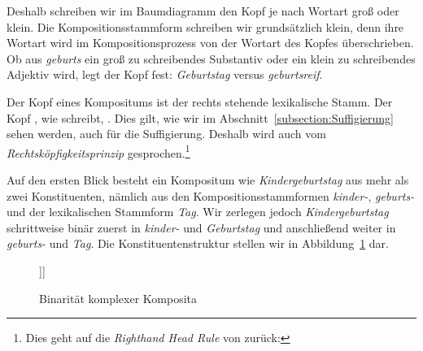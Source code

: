 \largerpage[2]
Deshalb schreiben wir im Baumdiagramm den Kopf je nach Wortart groß oder klein. Die Kompositionsstammform schreiben wir grundsätzlich klein, denn ihre Wortart wird im Kompositionsprozess von der Wortart des Kopfes überschrieben. Ob aus \textit{geburts} ein groß zu schreibendes Substantiv oder ein klein zu schreibendes Adjektiv wird, legt der Kopf fest: \textit{Geburtstag} versus \textit{geburtsreif}.

Der Kopf eines Kompositums ist der rechts stehende lexikalische Stamm. Der Kopf , wie \citet[338--339]{Olsen1991} schreibt, . Dies gilt, wie wir im Abschnitt~\ref{subsection:Suffigierung} sehen werden, auch für die Suffigierung. Deshalb wird auch vom \textit{Rechtsköpfigkeitsprinzip} gesprochen.\footnote{Dies geht auf die \textit{Righthand Head Rule} von \citet[248]{Williams1981} zurück: }

Auf den ersten Blick besteht ein Kompositum wie \textit{Kindergeburtstag} aus mehr als zwei Konstituenten, nämlich aus den Kompositionsstammformen \textit{kinder-}, \textit{geburts-} und der lexikalischen Stammform \textit{Tag}. Wir zerlegen jedoch \textit{Kindergeburtstag} schrittweise binär zuerst in \textit{kinder-} und \textit{Geburtstag} und anschließend weiter in \textit{geburts-} und \textit{Tag}. Die Konstituentenstruktur stellen wir in Abbildung~\ref{Abb:Kindergeburtstag} dar.

	\begin{figure}
		\centering
	\begin{forest}
		[Stammform\\Substantiv Mask\\ \textit{Kindergeburtstag}[Kompositionsstammform \\ Substantiv Neutr\\\textit{kinder}][Stammform\\ Substantiv Mask\\\textit{Geburtstag} [Kompositionsstammform\\Substantiv Fem \\\textit{geburts}] [Stammform \\ Substantiv Mask\\ \textit{Tag} ] ]]
	\end{forest}
	\caption{Binarität komplexer Komposita}\label{Abb:Kindergeburtstag}
\end{figure}


